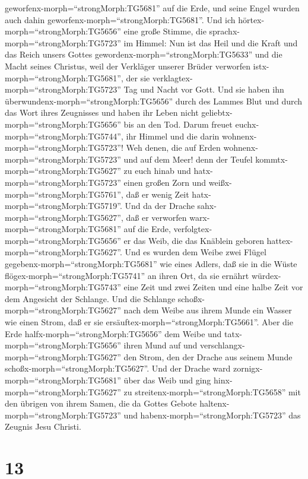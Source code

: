 geworfenx-morph=``strongMorph:TG5681'' auf die Erde, und seine Engel
wurden auch dahin geworfenx-morph=``strongMorph:TG5681''. 
Und ich hörtex-morph=``strongMorph:TG5656'' eine große Stimme, die
sprachx-morph=``strongMorph:TG5723'' im Himmel: Nun ist das Heil und die
Kraft und das Reich unsers Gottes gewordenx-morph=``strongMorph:TG5633''
und die Macht seines Christus, weil der Verkläger unserer Brüder
verworfen istx-morph=``strongMorph:TG5681'', der sie
verklagtex-morph=``strongMorph:TG5723'' Tag und Nacht vor Gott.
 Und sie haben ihn überwundenx-morph=``strongMorph:TG5656''
durch des Lammes Blut und durch das Wort ihres Zeugnisses und haben ihr
Leben nicht geliebtx-morph=``strongMorph:TG5656'' bis an den Tod.
 Darum freuet euchx-morph=``strongMorph:TG5744'', ihr
Himmel und die darin wohnenx-morph=``strongMorph:TG5723''! Weh denen,
die auf Erden wohnenx-morph=``strongMorph:TG5723'' und auf dem Meer!
denn der Teufel kommtx-morph=``strongMorph:TG5627'' zu euch hinab und
hatx-morph=``strongMorph:TG5723'' einen großen Zorn und
weißx-morph=``strongMorph:TG5761'', daß er wenig Zeit
hatx-morph=``strongMorph:TG5719''.  Und da der Drache
sahx-morph=``strongMorph:TG5627'', daß er verworfen
warx-morph=``strongMorph:TG5681'' auf die Erde,
verfolgtex-morph=``strongMorph:TG5656'' er das Weib, die das Knäblein
geboren hattex-morph=``strongMorph:TG5627''.  Und es wurden
dem Weibe zwei Flügel gegebenx-morph=``strongMorph:TG5681'' wie eines
Adlers, daß sie in die Wüste flögex-morph=``strongMorph:TG5741'' an
ihren Ort, da sie ernährt würdex-morph=``strongMorph:TG5743'' eine Zeit
und zwei Zeiten und eine halbe Zeit vor dem Angesicht der Schlange.
 Und die Schlange schoßx-morph=``strongMorph:TG5627'' nach
dem Weibe aus ihrem Munde ein Wasser wie einen Strom, daß er sie
ersäuftex-morph=``strongMorph:TG5661''.  Aber die Erde
halfx-morph=``strongMorph:TG5656'' dem Weibe und
tatx-morph=``strongMorph:TG5656'' ihren Mund auf und
verschlangx-morph=``strongMorph:TG5627'' den Strom, den der Drache aus
seinem Munde schoßx-morph=``strongMorph:TG5627''.  Und der
Drache ward zornigx-morph=``strongMorph:TG5681'' über das Weib und ging
hinx-morph=``strongMorph:TG5627'' zu
streitenx-morph=``strongMorph:TG5658'' mit den übrigen von ihrem Samen,
die da Gottes Gebote haltenx-morph=``strongMorph:TG5723'' und
habenx-morph=``strongMorph:TG5723'' das Zeugnis Jesu Christi.

\hypertarget{section-12}{%
\section{13}\label{section-12}}

